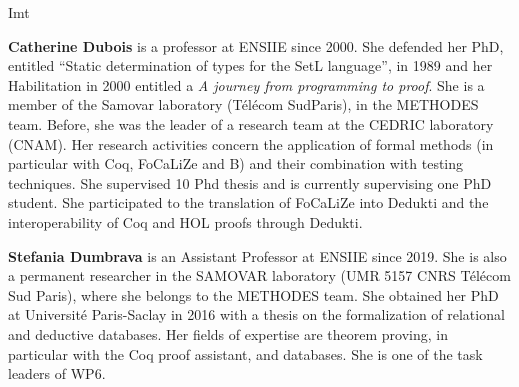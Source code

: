 \begin{sitedescription}{Imt}
\begin{compactitem}
\item {\bf Catherine Dubois} is a professor at ENSIIE since 2000. She defended her PhD, entitled ``Static determination of types for the SetL language'', in 1989 and her Habilitation in 2000 entitled a
\emph{A journey from programming to proof}. She is a 
member of the Samovar laboratory (T\'el\'ecom
SudParis), in the METHODES team. Before, she was the leader of a research team at the CEDRIC laboratory (CNAM). Her research activities concern the application of formal methods (in particular with Coq, FoCaLiZe and B) and their combination with testing techniques. She supervised 10 Phd thesis and is currently supervising one PhD student. She participated to the translation of FoCaLiZe into Dedukti and the interoperability of Coq and HOL proofs through Dedukti.

\item{\bf Stefania Dumbrava}
is an Assistant Professor at ENSIIE since 2019. She is also a permanent researcher in the SAMOVAR laboratory (UMR 5157 CNRS T\'el\'ecom
Sud Paris), where she belongs to the METHODES team. She obtained her PhD at Universit\'e Paris-Saclay in 2016 with a thesis on the formalization 
of relational and deductive databases. Her fields of expertise are theorem proving, in particular with the Coq proof assistant, and databases. 
She is one of the task leaders of WP6. 
\end{compactitem}


\end{sitedescription}

